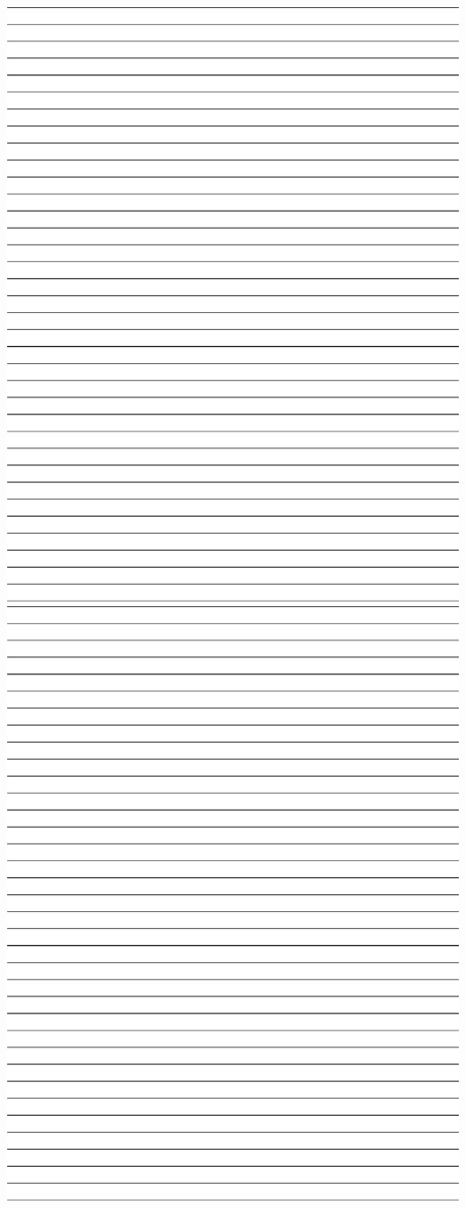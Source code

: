 \includegraphics[width=7.5in]{graphics/notepaper.eps}
\includegraphics[width=7.5in]{graphics/notepaper.eps}


